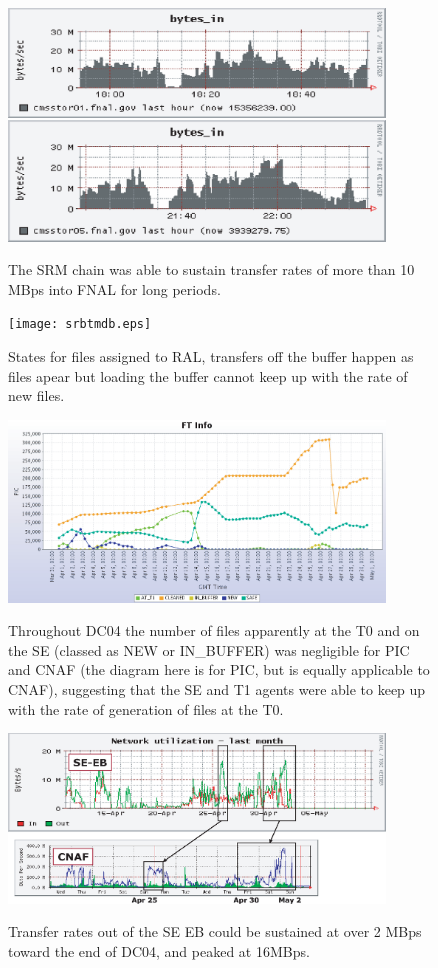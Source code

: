 \documentclass{cmspaper}
\begin{document}
\clearpage
\begin{figure}[tbp]
\centering
\includegraphics[angle=90,width=10cm]{FNAL-network.eps}
\label{fig:FNAL-network}
\caption{The SRM chain was able to sustain transfer rates of more than 10 MBps into FNAL for long periods.}
\end{figure}
\clearpage
\begin{figure}[tbp]
\centering
\texttt{[image: srbtmdb.eps]}
\label{fig:RAL-files}
\caption{States for files assigned to RAL, transfers off the buffer happen as files apear but loading the buffer cannot keep up with the rate of new files.}
\end{figure}
\clearpage
\begin{figure}[tbp]
\centering
\includegraphics[angle=90,width=10cm]{PIC-FT.eps}
\label{fig:PIC-FT}
\caption{Throughout DC04 the number of files apparently at the T0 and on the SE (classed as NEW or IN\_BUFFER) was negligible for PIC and CNAF (the diagram here is for PIC, but is equally applicable to CNAF), suggesting that the SE and T1 agents were able to keep up with the rate of generation of files at the T0. }
\end{figure}
\clearpage
\begin{figure}[tbp]
\centering
\includegraphics[angle=90,width=10cm]{SE-EB-network.eps}
\label{fig:SE-EB-network}
\caption{Transfer rates out of the SE EB could be sustained at over 2 MBps toward the end of DC04, and peaked at 16MBps.}
\end{figure}
\end{document}
